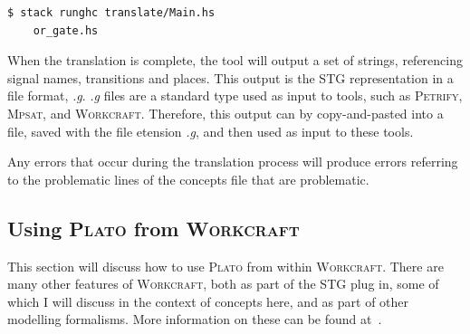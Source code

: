 \documentclass[british,conference,compsoc]{IEEEtran}
\newcommand{\noun}[1]{\textsc{#1}}
\begin{document}
\vspace{-2mm}

\begin{lstlisting}[language=bash]
  $ stack runghc translate/Main.hs 
  	or_gate.hs
\end{lstlisting}

\vspace{-1mm}


When the translation is complete, the tool will output a set of strings, 
referencing signal names, transitions and places.
This output is the STG representation in a file format, \emph{.g}. \emph{.g} 
files are a standard type used as input to tools, such as \noun{Petrify}, 
\noun{Mpsat}, and \noun{Workcraft}. Therefore, this output can by 
copy-and-pasted into a file, saved with the file etension \emph{.g}, and 
then used as input to these tools. 

Any errors that occur during the translation process will produce errors 
referring to the problematic lines of the concepts file that are problematic. 

\vspace{-2mm}

\subsection{Using \noun{Plato} from \noun{Workcraft} \label{sec:workcraft_usage}}

\vspace{-2mm}

This section will discuss how to use \noun{Plato} from within
\noun{Workcraft}. There are many other features of \noun{Workcraft}, both as 
part of the STG plug in, some of which I will discuss in the context of 
concepts here, and as part of other modelling formalisms. More information on 
these can be found at~\cite{Workcraft_website}.
\end{document}
